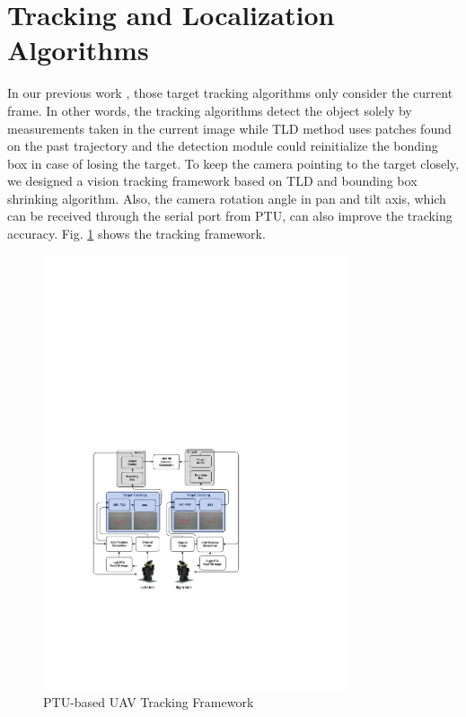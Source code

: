\section{Tracking and Localization Algorithms}
In our previous work \cite{ma2016stereo}\cite{tang2016ground}\cite{hu2016ros}, those target tracking algorithms only consider the current frame. In other words, the tracking algorithms detect the object solely by measurements taken in the current image while TLD method uses patches found on the past trajectory and the detection module could reinitialize the bonding box in case of losing the target. To keep the camera pointing to the target closely, we designed a vision tracking framework based on TLD and bounding box shrinking algorithm. Also, the camera rotation angle in pan and tilt axis, which can be received through the serial port from PTU, can also improve the tracking accuracy. Fig. \ref{fig:sci01_tracking_framework} shows the tracking framework.

\begin{figure}[!th]
	\centering
	\includegraphics[width=0.8\textwidth]{Figs/sci01_tracking_framework2.pdf}	
	\caption{PTU-based UAV Tracking Framework}
	\label{fig:sci01_tracking_framework}
\end{figure}

